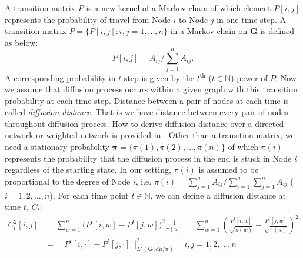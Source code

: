 \documentclass[12pt]{article}
\theoremstyle{definition}
\begin{document}
A transition matrix $P$ is a new kernel of a Markov chain of which element $P[i,j]$ represents the probability of travel from Node $i$ to Node $j$ in one time step. A transition matrix $P = \{P[i,j] : i,j=1,...,n \}$ in a Markov chain on $\mathbf{G}$ is defined as below:
\begin{equation}
P[i,j] = A_{ij} \big/ \sum\limits_{j=1}^{n} A_{ij}.
\end{equation}
 A corresponding probability in $t$ step is given by the $t^{\mbox{th}}$ ($t \in \mathbb{N}$) power of $P$. Now we assume that diffusion process occurs within a given graph with this transition probability at each time step. Distance between a pair of nodes at each time is called \textit{diffusion distance}. That is we have distance between every pair of nodes throughout diffusion process. How to derive diffusion distance over a directed network or weighted network is provided in \cite{tang2010graph}. Other than a transition matrix, we need a stationary probability $\mathbf{\pi} = \{\pi(1), \pi(2), ... , \pi(n) \}$ of which $\pi(i)$ represents the probability that the diffusion process in the end is stuck in Node $i$ regardless of the starting state. In our setting, $\pi(i)$ is assumed to be proportional to the degree of Node $i$, i.e. $\pi(i) = \sum\limits_{j=1}^{n} A_{ij} \big/ \sum\limits_{i=1}^{n}\sum\limits_{j=1}^{n} A_{ij}$ ($i=1,2,..., n$).  For each time point $t \in \mathbb{N}$, we can define a diffusion distance at time $t$, $C_{t}$:	
 \begin{equation}
 \label{eq:diffusion}
 \begin{split}
 C^2_{t}[i,j] & = \sum\limits_{w =1}^{n} \big( P^{t}[i,w] - P^{t}[j,w]  \big)^{2} \frac{1}{\pi(w)} = \sum\limits_{w=1}^{n} \left(  \frac{P^{t}[i,w]}{\sqrt{\pi(w)}} - \frac{P^{t}[j,w]}{\sqrt{\pi(w)}}   \right)^2 \\ & = \parallel P^{t}[i, \cdot] - P^{t}[j, \cdot]  \parallel^2_{L^{2}(\mathbf{G}, d\mu / \pi)  } \quad i,j = 1,2, \ldots , n
 \end{split}
 \end{equation}
\end{document}
